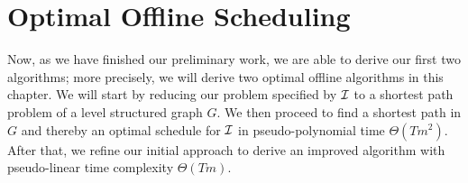 
\chapter{Optimal Offline Scheduling}
Now, as we have finished our preliminary work, we are able to derive our first two algorithms; more precisely, we will derive two optimal offline algorithms in this chapter.
We will start by reducing our problem specified by $\mathcal{I}$ to a shortest path problem of a level structured graph $G$. We then proceed to find a shortest path in $G$ and thereby an optimal schedule for $\mathcal{I}$ in pseudo-polynomial time $\Theta(Tm^2)$.
After that, we refine our initial approach to derive an improved algorithm with pseudo-linear time complexity $\Theta(Tm)$.

